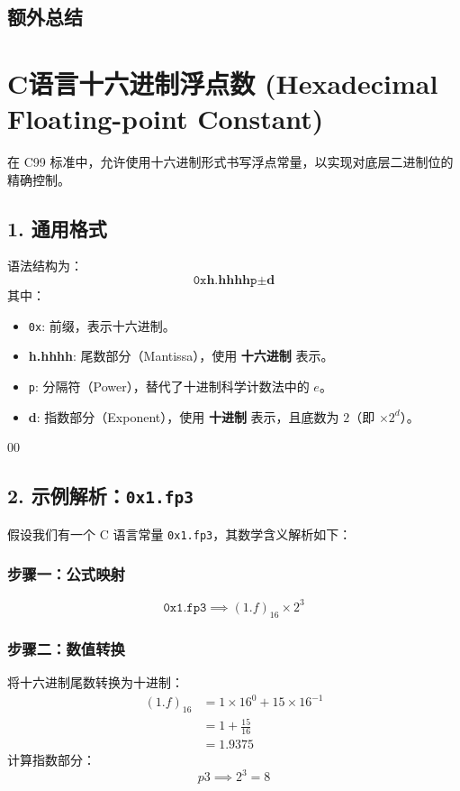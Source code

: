 \subsection{额外总结}
\section*{C语言十六进制浮点数 (Hexadecimal Floating-point Constant)}

在 C99 标准中，允许使用十六进制形式书写浮点常量，以实现对底层二进制位的精确控制。

\subsection*{1. 通用格式}
语法结构为：
$$ \texttt{0x}\textbf{h.hhhh}\texttt{p}\pm\textbf{d} $$
其中：
\begin{itemize}
    \item \texttt{0x}: 前缀，表示十六进制。
    \item \textbf{h.hhhh}: 尾数部分（Mantissa），使用 \textbf{十六进制} 表示。
    \item \texttt{p}: 分隔符（Power），替代了十进制科学计数法中的 $e$。
    \item \textbf{d}: 指数部分（Exponent），使用 \textbf{十进制} 表示，且底数为 $2$（即 $\times 2^d$）。
\end{itemize}00

\subsection*{2. 示例解析：\texttt{0x1.fp3}}
假设我们有一个 C 语言常量 \texttt{0x1.fp3}，其数学含义解析如下：

\subsubsection*{步骤一：公式映射}
$$ \texttt{0x1.fp3} \implies (1.f)_{16} \times 2^3 $$

\subsubsection*{步骤二：数值转换}
将十六进制尾数转换为十进制：
\begin{align*}
(1.f)_{16} &= 1 \times 16^0 + 15 \times 16^{-1} \\
           &= 1 + \frac{15}{16} \\
           &= 1.9375
\end{align*}
计算指数部分：
$$ p3 \implies 2^3 = 8 $$

